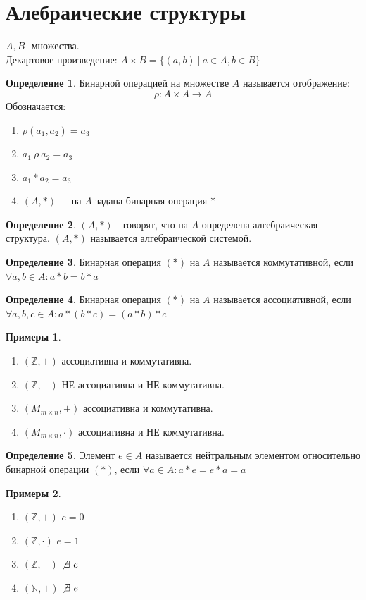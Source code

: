 \documentclass[a4paper, 12pt]{article}
\newcommand{\Z}{\mathbb Z}
\newcommand{\N}{\mathbb N}
\newcommand\tab[1][.5cm]{\hspace*{#1}}
\theoremstyle{definition}
\newtheorem*{definition}{Определение}
\newtheorem*{example}{Примеры}
\begin{document}
  \section{Алебраические структуры}
  $A,B$ -множества. \\
  Декартовое произведение: $A \times B = \{(a,b)\ |\ a \in A, b \in B\}$ 
  \begin{definition}
    Бинарной операцией на множестве $A$ называется отображение: $$\rho:A \times A \to A$$ 
    Обозначается: \begin{enumerate}
      \item $\rho(a_1,a_2) = a_3$
      \item $a_1 \ \rho \ a_2 = a_3$
      \item $a_1 * a_2 = a_3$ 
      \item $(A, *) - $ на $A$ задана бинарная операция $*$ 
    \end{enumerate}
  \end{definition}    
  \begin{definition}
    $(A,*)$ - говорят, что на $A$ определена алгебраическая структура. $(A,*)$ называется алгебраической системой. 
  \end{definition} 
  \begin{definition}
    Бинарная операция $(*)$ на $A$ называется коммутативной, если $\forall a,b \in A: a*b=b*a$ 
  \end{definition} 
  \begin{definition}
    Бинарная операция $(*)$ на $A$ называется ассоциативной, если $\forall a,b,c \in A: a*(b*c)=(a*b)*c$ 
  \end{definition}
  \begin{example}
    \begin{enumerate} \tab
      \item $(\Z, +)$ ассоциативна и коммутативна. 
      \item $(\Z, -)$ НЕ ассоциативна и НЕ коммутативна.
      \item $(M_{m \times n}, +)$ ассоциативна и коммутативна.
      \item $(M_{m \times n}, \cdot)$ ассоциативна и НЕ коммутативна.
    \end{enumerate}
  \end{example}
  \begin{definition}
    Элемент $e \in A$ называется нейтральным элементом относительно бинарной операции $(*)$, если $\forall a \in A: a*e = e*a = a$ 
  \end{definition} 
  \begin{example}
    \begin{enumerate} \tab
      \item $(\Z, +)$ $e=0$  
      \item $(\Z, \cdot)$ $e=1$ 
      \item $(\Z, -)$ $\not \exists \ e$ 
      \item $(\N, +)$ $\not \exists \ e$ 
    \end{enumerate}
  \end{example}
\end{document}
